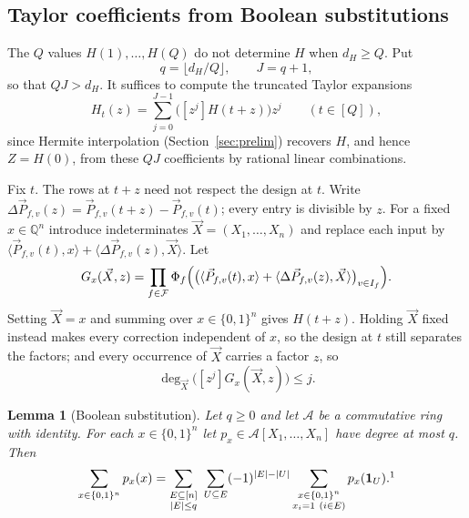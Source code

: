 \documentclass[11pt,reqno]{amsart}
\numberwithin{equation}{section}
\theoremstyle{plain}
\newtheorem{lemma}[theorem]{Lemma}
\theoremstyle{definition}
\theoremstyle{remark}
\newcommand{\A}{\mathcal{A}}
\newcommand{\F}{\mathcal{F}}
\newcommand{\Q}{\mathbb{Q}}
\newcommand{\PP}{\vec{P}}
\newcommand{\ip}[2]{\langle #1,#2\rangle}
\begin{document}
\subsection{Taylor coefficients from Boolean substitutions}
The $Q$ values $H(1),\dots,H(Q)$ do not determine $H$ when $d_H\ge Q$. Put
\begin{equation}\label{eq:qJ}
  q=\lfloor d_H/Q\rfloor,\qquad J=q+1 ,
\end{equation}
so that $QJ>d_H$. It suffices to compute the truncated Taylor expansions
\begin{equation}\label{eq:Ht}
  H_t(z)=\sum_{j=0}^{J-1}\bigl([z^j]H(t+z)\bigr)z^j\qquad(t\in[Q]),
\end{equation}
since Hermite interpolation (Section~\ref{sec:prelim}) recovers $H$, and hence
$Z=H(0)$, from these $QJ$ coefficients by rational linear combinations.

Fix $t$. The rows at $t+z$ need not respect the design at $t$. Write
$\Delta\PP_{f,v}(z)=\PP_{f,v}(t+z)-\PP_{f,v}(t)$; every entry is divisible by
$z$. For a fixed $x\in\Q^n$ introduce indeterminates $\vec X=(X_1,\dots,X_n)$ and
replace each input by $\ip{\PP_{f,v}(t)}{x}+\ip{\Delta\PP_{f,v}(z)}{\vec X}$. Let
\begin{equation}\label{eq:Gx}
  G_x(\vec X,z)=\prod_{f\in\F}\Phi_f\Bigl(\bigl(\ip{\PP_{f,v}(t)}{x}+\ip{\Delta\PP_{f,v}(z)}{\vec X}\bigr)_{v\in I_f}\Bigr).
\end{equation}
Setting $\vec X=x$ and summing over $x\in\{0,1\}^n$ gives $H(t+z)$. Holding
$\vec X$ fixed instead makes every correction independent of $x$, so the design at
$t$ still separates the factors; and every occurrence of $\vec X$ carries a factor
$z$, so
\begin{equation}\label{eq:degX}
  \deg_{\vec X}\bigl([z^j]G_x(\vec X,z)\bigr)\le j .
\end{equation}

\begin{lemma}[Boolean substitution]\label{lem:moebius}
Let $q\ge0$ and let $\A$ be a commutative ring with identity. For each
$x\in\{0,1\}^n$ let $p_x\in\A[X_1,\dots,X_n]$ have degree at most $q$. Then
\begin{equation}\label{eq:moebius}
  \sum_{x\in\{0,1\}^n}p_x(x)=\sum_{\substack{E\subseteq[n]\\|E|\le q}}\ \sum_{U\subseteq E}(-1)^{|E|-|U|}
  \sum_{\substack{x\in\{0,1\}^n\\ x_i=1\ (i\in E)}}p_x(\mathbf 1_U).\footnotemark
\end{equation}
\end{lemma}
\end{document}
